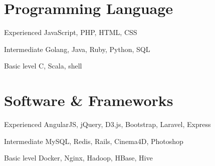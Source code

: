 \documentclass[fontsize=10pt]{tccv}
\begin{document}
%

\section{Programming Language}

\begin{factlist}

\item{Experienced}
     {JavaScript, PHP, HTML, CSS}

\item{Intermediate}
     {Golang, Java, Ruby, Python, SQL}

\item{Basic level}
     {C, Scala, shell}

\end{factlist}

\section{Software \& Frameworks}

\begin{factlist}

\item{Experienced}
     {AngularJS, jQuery, D3.js, Bootstrap, Laravel, Express}

\item{Intermediate}
     {MySQL, Redis, Rails, Cinema4D, Photoshop}

\item{Basic level}
     {Docker, Nginx, Hadoop, HBase, Hive}

\end{factlist}

\end{document}

